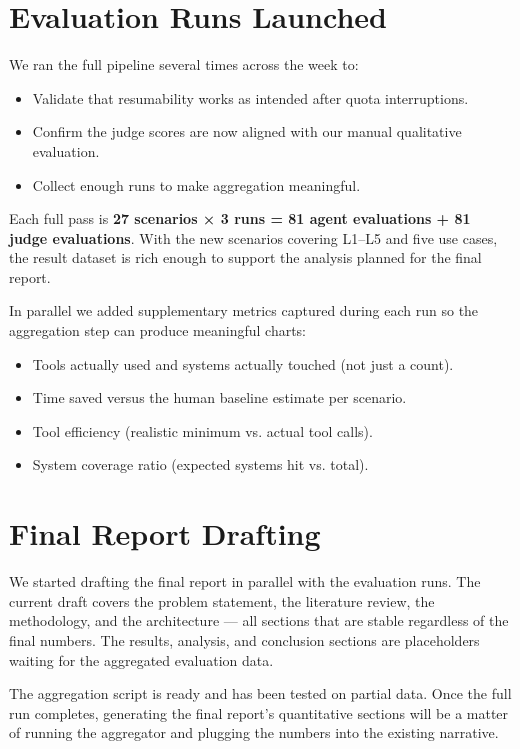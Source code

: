 \documentclass[11pt,a4paper]{article}
\begin{document}
\section{Evaluation Runs Launched}

We ran the full pipeline several times across the week to:
\begin{itemize}[itemsep=0.3em]
    \item Validate that resumability works as intended after quota interruptions.
    \item Confirm the judge scores are now aligned with our manual qualitative evaluation.
    \item Collect enough runs to make aggregation meaningful.
\end{itemize}

Each full pass is \textbf{27 scenarios × 3 runs = 81 agent evaluations + 81 judge evaluations}. With the new scenarios covering L1--L5 and five use cases, the result dataset is rich enough to support the analysis planned for the final report.

In parallel we added supplementary metrics captured during each run so the aggregation step can produce meaningful charts:
\begin{itemize}[itemsep=0.3em]
    \item Tools actually used and systems actually touched (not just a count).
    \item Time saved versus the human baseline estimate per scenario.
    \item Tool efficiency (realistic minimum vs. actual tool calls).
    \item System coverage ratio (expected systems hit vs. total).
\end{itemize}

\section{Final Report Drafting}

We started drafting the final report in parallel with the evaluation runs. The current draft covers the problem statement, the literature review, the methodology, and the architecture — all sections that are stable regardless of the final numbers. The results, analysis, and conclusion sections are placeholders waiting for the aggregated evaluation data.

The aggregation script is ready and has been tested on partial data. Once the full run completes, generating the final report's quantitative sections will be a matter of running the aggregator and plugging the numbers into the existing narrative.
\end{document}
